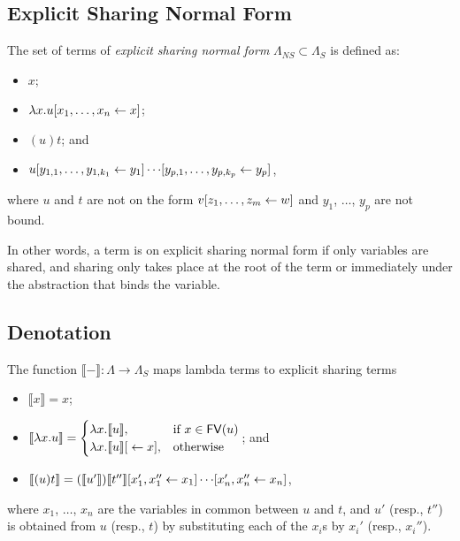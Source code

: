 \documentclass[11pt,a4paper]{article}
\theoremstyle{definition}
\theoremstyle{plain}
\theoremstyle{remark}
\begin{document}
\subsection{Explicit Sharing Normal Form}

The set of terms of \emph{explicit sharing normal form} $\Lambda_{NS}\subset\Lambda_S$ is defined as:

\begin{itemize}
	\item $x$;
	\item $\lambda x.{ { {u}[{{x_1},\dots,{x_n}}\leftarrow{x}] } }$;
	\item $(u)t$; and 
	\item ${ { {{ { {u}[{{y_{1,1}},\dots,{y_{1,k_1}}}\leftarrow{y_1}] } }\cdots}[{{y_{p,1}},\dots,{y_{p,k_p}}}\leftarrow{y_p}] } }$,
\end{itemize}
where $u$ and $t$ are not on the form ${ { {v}[{{z_1},\dots,{z_m}}\leftarrow{w}] } }$ and $y_1$, $\dots$, $y_p$ are not bound.

In other words, a term is on explicit sharing normal form if only variables are shared, and sharing only takes place at the root of the term or immediately under the abstraction that binds the variable.

\subsection{Denotation}

\newcommand{\terden}[1]{{\llbracket{#1}\rrbracket}}

The function $\terden{-}:\Lambda\rightarrow\Lambda_S$ maps lambda terms to explicit sharing terms

\begin{itemize}
	\item $\terden{x}=x$;
	\item $\terden{\lambda x.u}=
	  \begin{cases}
	      \lambda x.\terden{u}, & \mbox{if }x\in\FV(u) \\
	      \lambda x.\ternullshare{\terden{u}}{x}, & \mbox{otherwise}
	  \end{cases}$; and
	\item $\terden{(u)t}=\terbishare{\terbishare{(\terden{u'})\terden{t''}}{x'_1}{x''_1}{x_1}\cdots}{x'_n}{x''_n}{x_n}$,
\end{itemize}
where $x_1$, $\dots$, $x_n$ are the variables in common between $u$ and $t$, and $u'$ (resp., $t''$) is obtained from $u$ (resp., $t$) by substituting each of the $x_i$s by $x_i'$ (resp., $x_i''$).

\newcommand{\tercoden}[1]{{\lfloor{#1}\rfloor}}
\end{document}

